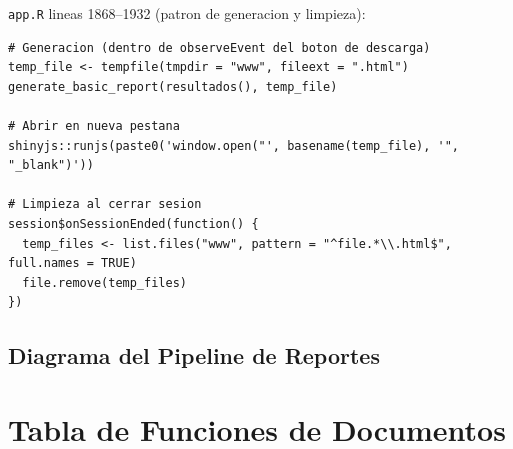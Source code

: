 \documentclass[11pt, letterpaper, twoside]{report}
\begin{document}
\begin{codigobox}
\texttt{app.R} lineas 1868--1932 (patron de generacion y limpieza):
\begin{lstlisting}[caption={Ciclo de vida de archivos temporales}]
# Generacion (dentro de observeEvent del boton de descarga)
temp_file <- tempfile(tmpdir = "www", fileext = ".html")
generate_basic_report(resultados(), temp_file)

# Abrir en nueva pestana
shinyjs::runjs(paste0('window.open("', basename(temp_file), '", "_blank")'))

# Limpieza al cerrar sesion
session$onSessionEnded(function() {
  temp_files <- list.files("www", pattern = "^file.*\\.html$", full.names = TRUE)
  file.remove(temp_files)
})
\end{lstlisting}
\end{codigobox}


\subsection{Diagrama del Pipeline de Reportes}

\begin{center}
\end{center}


\section{Tabla de Funciones de Documentos}
\end{document}
